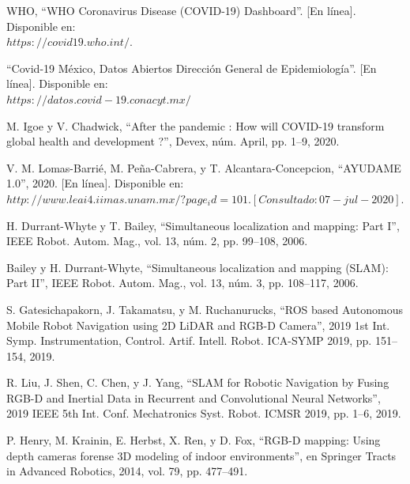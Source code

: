\documentclass[12pt]{book} %
\begin{document}
\begin{thebibliography}{} 

	
	  WHO, “WHO Coronavirus Disease (COVID-19) Dashboard”. [En línea]. Disponible en:\\ $https://covid19.who.int/$.

	 “Covid-19 México, Datos Abiertos Dirección General de Epidemiología”.  [En línea]. Disponible en:\\ $https://datos.covid-19.conacyt.mx/$

	
	 M. Igoe y V. Chadwick, “After the pandemic : How will COVID-19 transform global health and development ?”, Devex, núm. April, pp. 1–9, 2020.

	
	 V. M. Lomas-Barrié, M. Peña-Cabrera, y T. Alcantara-Concepcion, “AYUDAME 1.0”, 2020. [En línea]. Disponible en:\\ $http://www.leai4.iimas.unam.mx/?page_id=101. [Consultado: 07-jul-2020].$
	
	 H. Durrant-Whyte y T. Bailey, “Simultaneous localization and mapping: Part I”, IEEE Robot. Autom. Mag., vol. 13, núm. 2, pp. 99–108, 2006. 
	
	 Bailey y H. Durrant-Whyte, “Simultaneous localization and mapping (SLAM): Part II”, IEEE Robot. Autom. Mag., vol. 13, núm. 3, pp. 108–117, 2006.
	
	 S. Gatesichapakorn, J. Takamatsu, y M. Ruchanurucks, “ROS based Autonomous Mobile Robot Navigation using 2D LiDAR and RGB-D Camera”, 2019 1st Int. Symp. Instrumentation, Control. Artif. Intell. Robot. ICA-SYMP 2019, pp. 151–154, 2019.
	
	 R. Liu, J. Shen, C. Chen, y J. Yang, “SLAM for Robotic Navigation by Fusing RGB-D and Inertial Data in Recurrent and Convolutional Neural Networks”, 2019 IEEE 5th Int. Conf.
Mechatronics Syst. Robot. ICMSR 2019, pp. 1–6, 2019.

	 P. Henry, M. Krainin, E. Herbst, X. Ren, y D. Fox, “RGB-D mapping: Using depth cameras forense 3D modeling of indoor environments”, en Springer Tracts in Advanced Robotics, 2014, vol. 79, pp. 477–491.
	

\end{thebibliography}
\end{document}
